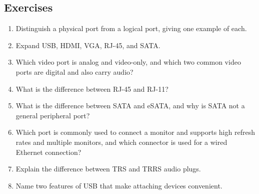 \subsection*{Exercises}
\begin{enumerate}[label=\arabic*.]
  \item Distinguish a physical port from a logical port, giving one example
    of each.
  \item Expand USB, HDMI, VGA, RJ-45, and SATA.
  \item Which video port is analog and video-only, and which two common video
    ports are digital and also carry audio?
  \item What is the difference between RJ-45 and RJ-11?
  \item What is the difference between SATA and eSATA, and why is SATA not a
    general peripheral port?
  \item Which port is commonly used to connect a monitor and supports high
    refresh rates and multiple monitors, and which connector is used for a
    wired Ethernet connection?
  \item Explain the difference between TRS and TRRS audio plugs.
  \item Name two features of USB that make attaching devices convenient.
\end{enumerate}


